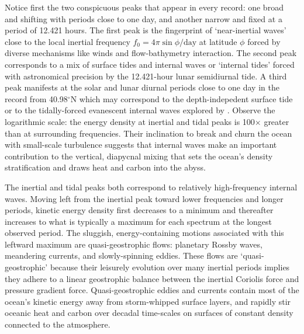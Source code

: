 \documentclass[12pt, oneside]{book}
\begin{document}
Notice first the two conspicuous peaks that appear in every record: one broad and shifting with periods close to one day, and another narrow and fixed at a period of 12.421 hours.  The first peak is the fingerprint of `near-inertial waves' close to the local inertial frequency $f_0 = 4 \pi \sin \phi / \mathrm{day}$ at latitude $\phi$ forced by diverse mechanisms like winds and flow-bathymetry interaction.  The second peak corresponds to a mix of surface tides and internal waves or `internal tides' forced with astronomical precision by the 12.421-hour lunar semidiurnal tide.  A third peak manifests at the solar and lunar diurnal periods close to one day in the record from 40.98$^\circ$N which may correspond to the depth-indepedent surface tide or to the tidally-forced evanescent internal waves explored by \citet{musgrave2016stratified}.  Observe the logarithmic scale: the energy density at inertial and tidal peaks is 100$\times$ greater than at surrounding frequencies.  Their inclination to break and churn the ocean with small-scale turbulence suggests that internal waves make an important contribution to the vertical, diapycnal mixing that sets the ocean's density stratification and draws heat and carbon into the abyss.

\nocite{westpacData}

The inertial and tidal peaks both correspond to relatively high-frequency internal waves.  Moving left from the inertial peak toward lower frequencies and longer periods, kinetic energy density first decreases to a minimum and thereafter increases to what is typically a maximum for each spectrum at the longest observed period.  The sluggish, energy-containing motions associated with this leftward maximum are quasi-geostrophic flows: planetary Rossby waves, meandering currents, and slowly-spinning eddies.  These flows are `quasi-geostrophic' because their leisurely evolution over many inertial periods implies they adhere to a linear geostrophic balance between the inertial Coriolis force and pressure gradient force.  Quasi-geostrophic eddies and currents contain most of the ocean's kinetic energy away from storm-whipped surface layers, and rapidly stir oceanic heat and carbon over decadal time-scales on surfaces of constant density connected to the atmosphere.
\end{document}

